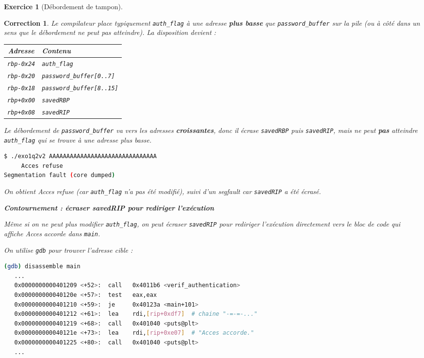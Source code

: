 \documentclass[a4paper,11pt]{article}
\theoremstyle{plain}
\newtheorem{correction}{Correction}
\theoremstyle{definition}
\newtheorem{exercice}{Exercice}
\begin{document}
\begin{exercice}[Débordement de tampon]
\begin{enumerate}
\begin{correction}
Le compilateur place typiquement \texttt{auth\_flag} à une adresse \textbf{plus basse} que \texttt{password\_buffer} sur la pile (ou à côté dans un sens que le débordement ne peut pas atteindre). La disposition devient :

\begin{center}
\begin{tabular}{|c|l|}
\hline
\textbf{Adresse} & \textbf{Contenu} \\
\hline
\texttt{rbp-0x24} & \texttt{auth\_flag} \\
\texttt{rbp-0x20} & \texttt{password\_buffer[0..7]} \\
\texttt{rbp-0x18} & \texttt{password\_buffer[8..15]} \\
\texttt{rbp+0x00} & \texttt{savedRBP} \\
\texttt{rbp+0x08} & \texttt{savedRIP} \\
\hline
\end{tabular}
\end{center}

Le débordement de \texttt{password\_buffer} va vers les adresses \textbf{croissantes}, donc il écrase \texttt{savedRBP} puis \texttt{savedRIP}, mais ne peut \textbf{pas} atteindre \texttt{auth\_flag} qui se trouve à une adresse plus basse.

\begin{lstlisting}[language=bash,numbers=none]
$ ./exo1q2v2 AAAAAAAAAAAAAAAAAAAAAAAAAAAAAAA
     Acces refuse
Segmentation fault (core dumped)
\end{lstlisting}

On obtient \og{}Acces refuse\fg{} (car \texttt{auth\_flag} n'a pas été modifié), suivi d'un \textit{segfault} car \texttt{savedRIP} a été écrasé.

\bigskip

\textbf{Contournement : écraser savedRIP pour rediriger l'exécution}

Même si on ne peut plus modifier \texttt{auth\_flag}, on peut écraser \texttt{savedRIP} pour rediriger l'exécution directement vers le bloc de code qui affiche \og{}Acces accorde\fg{} dans \texttt{main}.

On utilise \texttt{gdb} pour trouver l'adresse cible :
\begin{lstlisting}[language=bash,numbers=none]
(gdb) disassemble main
   ...
   0x0000000000401209 <+52>:  call   0x4011b6 <verif_authentication>
   0x000000000040120e <+57>:  test   eax,eax
   0x0000000000401210 <+59>:  je     0x40123a <main+101>
   0x0000000000401212 <+61>:  lea    rdi,[rip+0xdf7]  # chaine "-=-=-..."
   0x0000000000401219 <+68>:  call   0x401040 <puts@plt>
   0x000000000040121e <+73>:  lea    rdi,[rip+0xe07]  # "Acces accorde."
   0x0000000000401225 <+80>:  call   0x401040 <puts@plt>
   ...
\end{lstlisting}


\end{correction}
\end{enumerate}
\end{exercice}
\end{document}
